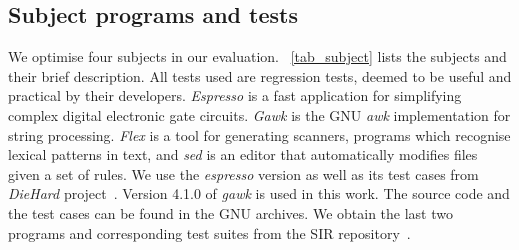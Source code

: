 \documentclass[oribibl]{llncs}
\begin{document}
%
%
%





\subsection{Subject programs and tests}
\label{sec_subject}

We optimise four subjects in our evaluation. 
\tablename~\ref{tab_subject} lists the subjects and their brief description. All tests used are regression tests, deemed to be useful and practical by their developers.
\emph{Espresso} is a fast application for simplifying complex digital electronic gate circuits.
\emph{Gawk} is the GNU \emph{awk} implementation for string processing.
\emph{Flex} is a tool for generating scanners, programs which recognise lexical patterns in text, and \emph{sed} is an editor that automatically modifies files given a set of rules. 
We use the \emph{espresso} version as well as its test cases from \emph{DieHard} project~\cite{Berger:2006:DPM:1133981.1134000}.
Version 4.1.0 of \emph{gawk} is used in this work.
The source code and the test cases can be found in the GNU archives.
We obtain the last two programs and corresponding test suites from the SIR repository~\cite{SIR2005}. 
\end{document}
